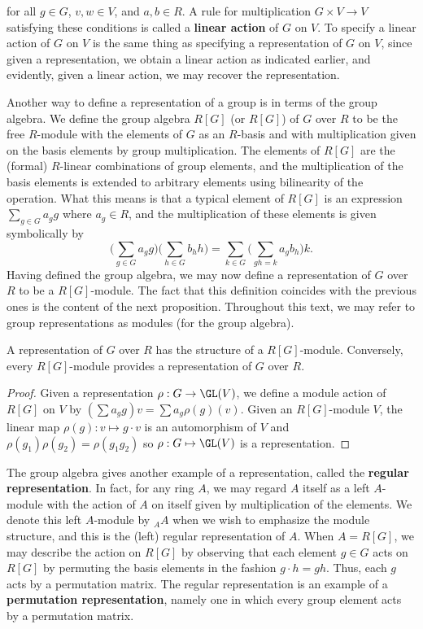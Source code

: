 for all $g\in G$, $v,w\in V$, and $a,b\in R$. A rule for multiplication $G\times V\to V$ satisfying these conditions is called a \textbf{linear action} of $G$ on $V$. To specify a linear action of $G$ on $V$ is the same thing as specifying a representation of $G$ on $V$, since given a representation, we obtain a linear action as indicated earlier, and evidently, given a linear action, we may recover the representation.\par
Another way to define a representation of a group is in terms of the group
algebra. We define the group algebra $R[G]$ (or $R[G]$) of $G$ over $R$ to be the free $R$-module with the elements of $G$ as an $R$-basis and with multiplication given on the basis elements by group multiplication. The elements of $R[G]$ are the (formal) $R$-linear combinations of group elements, and the multiplication of the basis elements is extended to arbitrary elements using bilinearity of the operation. What this means is that a typical element of $R[G]$ is an expression $\sum_{g\in G}a_gg$ where $a_g\in R$, and the multiplication of these elements is given symbolically by
\[\Big(\sum_{g\in G}a_gg\Big)\Big(\sum_{h\in G}b_hh\Big)=\sum_{k\in G}\Big(\sum_{gh=k}a_gb_h\Big)k.\]
Having defined the group algebra, we may now define a representation of $G$ over $R$ to be a $R[G]$-module. The fact that this definition coincides with the previous ones is the content of the next proposition. Throughout this text, we may refer to group representations as modules (for the group algebra).
\begin{proposition}
A representation of $G$ over $R$ has the structure of a $R[G]$-module. Conversely, every $R[G]$-module provides a representation of $G$ over $R$.
\end{proposition}
\begin{proof}
Given a representation $\rho:G\to\GL(V)$, we define a module action of $R[G]$ on $V$ by $(\sum a_gg)v=\sum a_g\rho(g)(v)$. Given an $R[G]$-module $V$, the linear map $\rho(g):v\mapsto g\cdot v$ is an automorphism of $V$ and $\rho(g_1)\rho(g_2)=\rho(g_1g_2)$ so $\rho:G\mapsto\GL(V)$ is a representation.
\end{proof}
The group algebra gives another example of a representation, called the \textbf{regular representation}. In fact, for any ring $A$, we may regard $A$ itself as a left $A$-module with the action of $A$ on itself given by multiplication of the elements. We denote this left $A$-module by $_{A}A$ when we wish to emphasize the module structure, and this is the (left) regular representation of $A$. When $A=R[G]$, we may describe the action on $R[G]$ by observing that each element $g\in G$ acts on $R[G]$ by permuting the basis elements in the fashion $g\cdot h=gh$. Thus, each $g$ acts by a permutation matrix. The regular representation is an example of a \textbf{permutation representation}, namely one in which every group element acts by a permutation matrix.\par
